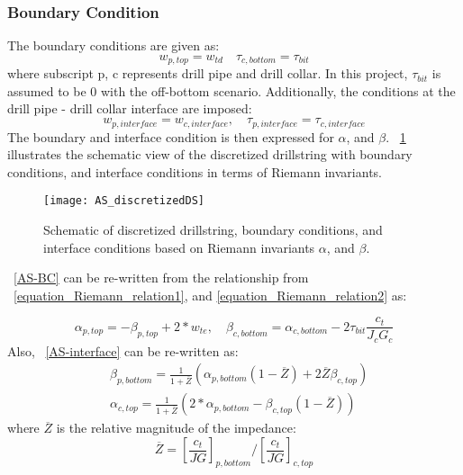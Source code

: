 \subsubsection{Boundary Condition}
The boundary conditions are given as:
\begin{equation}\label{AS-BC}
  w_{p,top} = w_{td} \quad \tau_{c,bottom} = \tau_{bit}
\end{equation}
where subscript p, c represents drill pipe and drill collar. In this project, $\tau_{bit}$ is assumed to be 0 with the off-bottom scenario. 
Additionally, the conditions at the drill pipe - drill collar interface are imposed:
\begin{equation}\label{AS-interface}
  w_{p,interface} = w_{c,interface}, \quad \tau_{p,interface} = \tau_{c,interface}
\end{equation}
The boundary and interface condition is then expressed for $\alpha$, and $\beta$. \figurename~\ref{AS_discretizeDS} illustrates the schematic view of the discretized drillstring with boundary conditions, and interface conditions in terms of Riemann invariants.
\begin{figure}[!hbt]
  \centering
  \texttt{[image: AS\_discretizedDS]}
  \caption[Schematic of discretized drillstring and boundary conditions]{Schematic of discretized drillstring, boundary conditions, and interface conditions based on Riemann invariants $\alpha$, and $\beta$.}\label{AS_discretizeDS}
\end{figure}

\equationname~\ref{AS-BC} can be re-written from the relationship from \equationname~\ref{equation_Riemann_relation1}, and \ref{equation_Riemann_relation2} as:

\begin{equation}\label{AS-riemannBC}
  \alpha_{p,top} = -\beta_{p,top} + 2*w_{te}, \quad \beta_{c,bottom} = \alpha_{c,bottom} - 2\tau_{bit} \frac{c_t}{J_c G_c}
\end{equation}
Also, \equationname~\ref{AS-interface} can be re-written as:
\begin{equation}\label{AS-riemanninterface}
\begin{split}
    & \beta_{p,bottom} = \frac{1}{1+\overline{Z}}\left(\alpha_{p,bottom}(1-\overline{Z}) + 2\overline{Z}\beta_{c,top} \right) \\
    & \alpha_{c,top} = \frac{1}{1+\overline{Z}}\left(2*\alpha_{p,bottom} - \beta_{c,top}(1-\overline{Z})\right)
\end{split}
\end{equation}
where $\overline{Z}$ is the relative magnitude of the impedance:
\begin{equation}\label{AS_Zbar}
  \overline{Z} = \left[\frac{c_t}{JG}\right]_{p,bottom} / \left[\frac{c_t}{JG}\right]_{c,top}
\end{equation}

